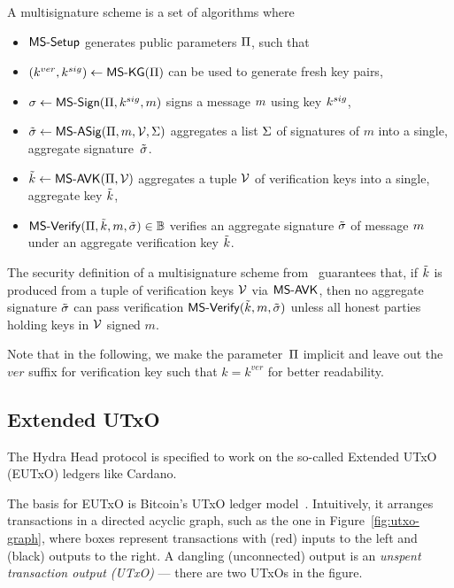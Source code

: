 \noindent A multisignature scheme is a set of algorithms where
\begin{itemize}
	\item $\mathsf{MS\textsf{-}{}Setup}$ generates public parameters $\Pi$, such that
	\item $(k^{ver},k^{sig}) \gets \mathsf{MS\textsf{-}{}KG}(\Pi)$ can be used to generate fresh
	      key pairs,
	\item $\sigma \gets \mathsf{MS\textsf{-}{}Sign}(\Pi,k^{sig},m)$ signs a message $m$
	      using key $k^{sig}$,
	\item $\tilde\sigma \gets \mathsf{MS\textsf{-}{}ASig}(\Pi,m,\mathcal{V},\Sigma)$ aggregates a
	      list $\Sigma$  of signatures of $m$ into a single, aggregate
	      signature~$\tilde\sigma$.
	\item $\tilde{k} \gets \mathsf{MS\textsf{-}{}AVK}(\Pi,\mathcal{V})$ aggregates a tuple $\mathcal{V}$
	      of verification keys into a single, aggregate key $\tilde{k}$,
	\item $\mathsf{MS\textsf{-}{}Verify}(\Pi,\tilde{k},m,\tilde\sigma) \in \mathbb{B}$ verifies an aggregate
	      signature $\tilde\sigma$ of message $m$ under an aggregate verification
	      key $\tilde{k}$.
\end{itemize}

The security definition of a multisignature scheme
from~\cite{itakura1983public,CCS:MicOhtRey01} guarantees that, if $\tilde{k}$ is
produced from a tuple of verification keys $\mathcal{V}$ via $\mathsf{MS\textsf{-}{}AVK}$, then no
aggregate signature $\tilde\sigma$ can pass verification
$\mathsf{MS\textsf{-}{}Verify}(\tilde{k},m,\tilde\sigma)$ unless all honest parties holding keys in
$\mathcal{V}$ signed $m$.

Note that in the following, we make the parameter~$\Pi$ implicit and leave
out the $ver$ suffix for verification key such that $k = k^{ver}$ for better
readability.

\subsection{Extended UTxO}\label{sec:eutxo}
The Hydra Head protocol is specified to work on the so-called Extended UTxO (EUTxO) ledgers
like Cardano.

The basis for EUTxO is Bitcoin's UTxO ledger
model~\cite{formal-model-of-bitcoin-transactions,Zahnentferner18-UTxO}.
Intuitively, it arranges transactions in a directed acyclic graph, such as the
one in Figure~\ref{fig:utxo-graph}, where boxes represent transactions with
(red) inputs to the left and (black) outputs to the right. A dangling
(unconnected) output is an \emph{unspent transaction output (UTxO)} --- there
are two UTxOs in the figure.

